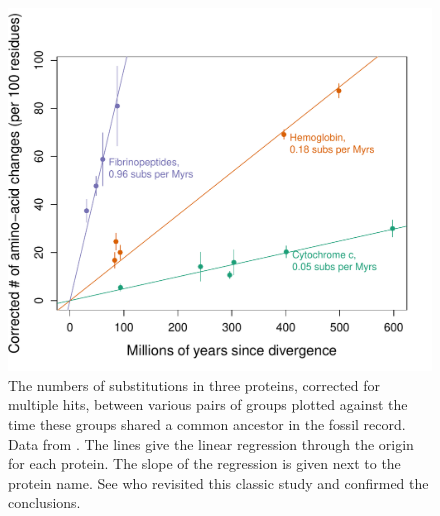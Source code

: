 \begin{figure}
\begin{center}
\includegraphics[width=0.8 \textwidth]{Journal_figs/genetic_drift/Molecular_clock_Dickerson/Dickerson_1979_mole_clock_fig.pdf}
\end{center}
\caption{The numbers of substitutions in three proteins, corrected for multiple hits, between various pairs of groups plotted against the time these groups shared a common ancestor in the fossil record. Data from  \citet{dickerson1971structure}.  The lines give the linear regression through the origin for each protein. The slope of the regression is given next to the protein name.  See \citep{robinson2016revisiting} who revisited this classic study and confirmed the conclusions.} \label{fig:Dickerson_mole_clock}
\end{figure}

